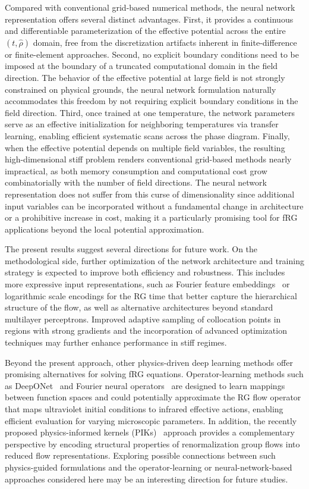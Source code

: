 \documentclass[reprint,twocolumn,superscriptaddress,preprintnumbers,amsmath,amssymb,aps,prd,floatfix]{revtex4-2}
\begin{document}
Compared with conventional grid-based numerical methods, the neural network representation offers several distinct advantages. First, it provides a continuous and differentiable parameterization of the effective potential across the entire $(t,\hat{\rho})$ domain, free from the discretization artifacts inherent in finite-difference or finite-element approaches. Second, no explicit boundary conditions need to be imposed at the boundary of a truncated computational domain in the field direction. The behavior of the effective potential at large field is not strongly constrained on physical grounds, the neural network formulation naturally accommodates this freedom by not requiring explicit boundary conditions in the field direction. Third, once trained at one temperature, the network parameters serve as an effective initialization for neighboring temperatures via transfer learning, enabling efficient systematic scans across the phase diagram. Finally, when the effective potential depends on multiple field variables, the resulting high-dimensional stiff problem renders conventional grid-based methods nearly impractical, as both memory consumption and computational cost grow combinatorially with the number of field directions. The neural network representation does not suffer from this curse of dimensionality since additional input variables can be incorporated without a fundamental change in architecture or a prohibitive increase in cost, making it a particularly promising tool for fRG applications beyond the local potential approximation.


The present results suggest several directions for future work. On the methodological side, further optimization of the network architecture and training strategy is expected to improve both efficiency and robustness. This includes more expressive input representations, such as Fourier feature embeddings~\cite{tancik2020ffn} or logarithmic scale encodings for the RG time that better capture the hierarchical structure of the flow, as well as alternative architectures beyond standard multilayer perceptrons. Improved adaptive sampling of collocation points in regions with strong gradients and the incorporation of advanced optimization techniques may further enhance performance in stiff regimes.


Beyond the present approach, other physics-driven deep learning methods offer promising alternatives for solving fRG equations. Operator-learning methods such as DeepONet~\cite{Lu_2021} and Fourier neural operators~\cite{li2021fourierneuraloperatorparametric} are designed to learn mappings between function spaces and could potentially approximate the RG flow operator that maps ultraviolet initial conditions to infrared effective actions, enabling efficient evaluation for varying microscopic parameters. In addition, the recently proposed physics-informed kernels (PIKs)~\cite{Ihssen:2024ihp,Ihssen:2025ybn,Ihssen:2025hyl,Ihssen:2026njd} approach provides a complementary perspective by encoding structural properties of renormalization group flows into reduced flow representations. Exploring possible connections between such physics-guided formulations and the operator-learning or neural-network-based approaches considered here may be an interesting direction for future studies.
\end{document}
